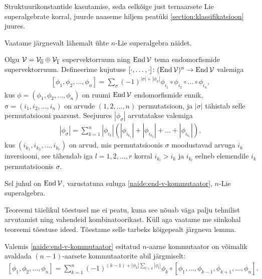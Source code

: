 Struktuurikonstantide kasutamise, seda eelkõige just ternaarsete Lie
superalgebrate korral, juurde naaseme hiljem peatüki
\ref{section:klassifikatsioon} juures.

Vaatame järgnevalt lähemalt ühte $n$-Lie superalgebra näidet.
\cite{Abramov:2014}

\begin{thm}\label{teoreem:endomorphism-lie-algebra}
    Olgu $\mathcal{V} = \mathcal{V}_{\overline{0}} \oplus \mathcal{V}_{\overline{1}}$
    supervektorruum ning $\operatorname{End} \mathcal{V}$ tema endomorfismide
    supervektorruum. Defineerime kujutuse
    $[\cdot, \dots, \cdot] \colon (\operatorname{End} \mathcal{V})^n \to \operatorname{End} \mathcal{V}$ valemiga
    \begin{align}\label{naide:end-v-kommutaator}
        [\phi_1, \phi_2, \dots, \phi_n] =
        \sum_\sigma (-1)^{|\sigma|+|\phi_\sigma|}
            \phi_{i_1} \circ \phi_{i_2} \circ \ldots \circ \phi_{i_n},
    \end{align}
    kus $\phi = (\phi_1, \phi_2, \dots, \phi_n)$ on ruumi
    $\operatorname{End} \mathcal{V}$ endomorfismide ennik,
    $\mathrm{\sigma} = (i_1, i_2, \dots, i_n)$ on arvude
    $(1, 2, \dots, n)$ permutatsioon, ja $|\sigma|$
    tähistab selle permutatsiooni paarsust. Seejuures
    $|\phi_\sigma|$ arvutatakse valemiga
    \begin{align}\label{eq:permutation-parity}
        |\phi_\sigma| = \sum_{k=1}^{n} |\phi_{i_k}|
            \left(
                |\phi_{i_{k_1}}| + |\phi_{i_{k_2}}| + \dots +
                |\phi_{i_{k_r}}|
            \right),
    \end{align}
    kus $(i_{k_1}, i_{k_2}, \dots, i_{k_r})$ on arvud, mis
    permutatsioonis $\sigma$ moodustavad arvuga $i_k$ inversiooni,
    see tähendab iga $l = 1, 2, \dots, r$ korral $i_{k_l} > i_k$ ja
    $i_{k_l}$ eelneb elemendile $i_k$ permutatsioonis $\sigma$.

    Sel juhul on $\operatorname{End} \mathcal{V}$, varustatuna suluga
    \eqref{naide:end-v-kommutaator}, $n$-Lie superalgebra.
\end{thm}

Teoreemi täielikul tõestusel me ei peatu, kuna see nõuab väga palju
tehnilist arvutamist ning vahendeid kombinatoorikast. Küll aga vaatame
me siinkohal teoreemi tõestuse ideed. Tõestame selle tarbeks kõigepealt
järgneva lemma.

\begin{lemma}\label{lemma:n-sulg to (n-1)-sulg}
    Valemis \eqref{naide:end-v-kommutaator} esitatud $n$-aarne
    kommutaator on võimalik avaldada $(n-1)$-aarsete
    kommutaatorite abil järgmiselt:
    \begin{align}\label{eq:n komm by n-1 komm}
        [\phi_1, \phi_2, \dots, \phi_n] =
        \sum_{k=1}^{n} (-1)^{
            (k-1) + |\phi_k| \sum_{l < k} |\phi_l|
        } \phi_k \circ [
            \phi_1, \dots, \phi_{k-1}, \phi_{k+1}, \dots, \phi_n
        ].
    \end{align}
\end{lemma}

